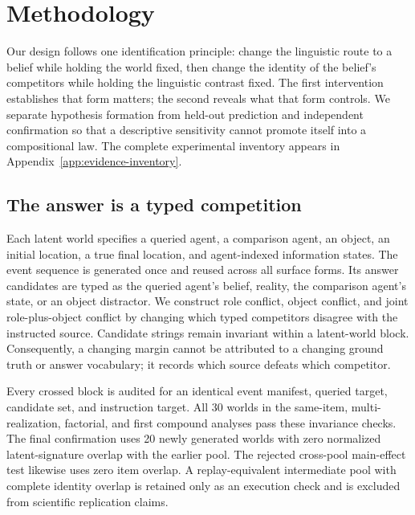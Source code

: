 \section{Methodology}

Our design follows one identification principle: change the linguistic route to
a belief while holding the world fixed, then change the identity of the
belief's competitors while holding the linguistic contrast fixed. The first
intervention establishes that form matters; the second reveals what that form
controls. We separate hypothesis formation from held-out prediction and
independent confirmation so that a descriptive sensitivity cannot promote
itself into a compositional law. The complete experimental inventory appears in
Appendix~\ref{app:evidence-inventory}.

\subsection{The answer is a typed competition}

Each latent world specifies a queried agent, a comparison agent, an object, an
initial location, a true final location, and agent-indexed information states.
The event sequence is generated once and reused across all surface forms. Its
answer candidates are typed as the queried agent's belief, reality, the
comparison agent's state, or an object distractor. We construct role conflict,
object conflict, and joint role-plus-object conflict by changing which typed
competitors disagree with the instructed source. Candidate strings remain
invariant within a latent-world block. Consequently, a changing margin cannot
be attributed to a changing ground truth or answer vocabulary; it records
which source defeats which competitor.

Every crossed block is audited for an identical event manifest, queried target,
candidate set, and instruction target. All 30 worlds in the same-item,
multi-realization, factorial, and first compound analyses pass these invariance
checks. The final confirmation uses 20 newly generated worlds with zero
normalized latent-signature overlap with the earlier pool. The rejected
cross-pool main-effect test likewise uses zero item overlap. A replay-equivalent
intermediate pool with complete identity overlap is retained only as an
execution check and is excluded from scientific replication claims.

